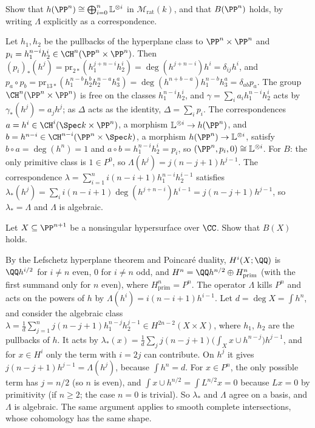 \begin{exercise}\label{absolute-hodge:exercise-projective-space}
Show that $h(\PP^n) \cong \bigoplus_{i=0}^n\mathbb{L}^{\otimes i}$ in $\mathcal{M}_{\mathrm{rat}}(k)$, and that $B(\PP^n)$ holds, by writing $\Lambda$ explicitly as a correspondence.
\end{exercise}

\begin{solution}
Let $h_1, h_2$ be the pullbacks of the hyperplane class to $\PP^n \times \PP^n$ and $p_i = h_1^{n-i}h_2^i \in \CH^n(\PP^n \times \PP^n)$. Then $(p_i)_*(h^j) = \mathrm{pr}_{2*}(h_1^{j+n-i}h_2^i) = \deg(h^{j+n-i})h^i = \delta_{ij}h^i$, and
$p_a \circ p_b = \mathrm{pr}_{13*}(h_1^{n-b}h_2^{b}h_2^{n-a}h_3^a) = \deg(h^{n+b-a})h_1^{n-b}h_3^a = \delta_{ab}p_a$. The group $\CH^n(\PP^n \times \PP^n)$ is free on the classes $h_1^{n-i}h_2^i$, and
$\gamma = \sum_ia_ih_1^{n-i}h_2^i$ acts by $\gamma_*(h^j) = a_jh^j$; as $\Delta$ acts as the identity, $\Delta = \sum_ip_i$. The correspondences $a = h^i \in \CH^i(\Spec k \times \PP^n)$, a morphism $\mathbb{L}^{\otimes i} \to h(\PP^n)$,
and $b = h^{n-i} \in \CH^{n-i}(\PP^n \times \Spec k)$, a morphism $h(\PP^n) \to \mathbb{L}^{\otimes i}$, satisfy $b \circ a = \deg(h^n) = 1$ and $a \circ b = h_1^{n-i}h_2^i = p_i$, so $(\PP^n, p_i, 0) \cong \mathbb{L}^{\otimes i}$. For $B$: the
only primitive class is $1 \in P^0$, so $\Lambda(h^j) = j(n - j + 1)h^{j-1}$. The correspondence $\lambda = \sum_{i=1}^ni(n - i + 1)h_1^{n-i}h_2^{i-1}$ satisfies
$\lambda_*(h^j) = \sum_ii(n - i + 1)\deg(h^{j+n-i})h^{i-1} = j(n - j + 1)h^{j-1}$, so $\lambda_* = \Lambda$ and $\Lambda$ is algebraic.
\end{solution}

\begin{exercise}\label{absolute-hodge:exercise-hypersurface}
Let $X \subseteq \PP^{n+1}$ be a nonsingular hypersurface over $\CC$. Show that $B(X)$ holds.
\end{exercise}

\begin{solution}
By the Lefschetz hyperplane theorem and Poincar\'e duality, $H^i(X; \QQ)$ is $\QQ h^{i/2}$ for $i \neq n$ even, $0$ for $i \neq n$ odd, and $H^n = \QQ h^{n/2} \oplus H^n_{\mathrm{prim}}$ (with the first summand only for $n$ even),
where $H^n_{\mathrm{prim}} = P^n$. The operator $\Lambda$ kills $P^n$ and acts on the powers of $h$ by $\Lambda(h^i) = i(n - i + 1)h^{i-1}$. Let $d = \deg X = \int h^n$, and consider the algebraic class
$\lambda = \frac1d\sum_{j=1}^nj(n - j + 1)h_1^{n-j}h_2^{j-1} \in H^{2n-2}(X \times X)$, where $h_1$, $h_2$ are the pullbacks of $h$. It acts by $\lambda_*(x) = \frac1d\sum_jj(n - j + 1)\big(\int_Xx \cup h^{n-j}\big)h^{j-1}$, and for
$x \in H^i$ only the term with $i = 2j$ can contribute. On $h^j$ it gives $j(n - j + 1)h^{j-1} = \Lambda(h^j)$, because $\int h^n = d$. For $x \in P^n$, the only possible term has $j = n/2$ (so $n$ is even), and
$\int x \cup h^{n/2} = \int L^{n/2}x = 0$ because $Lx = 0$ by primitivity (if $n \geq 2$; the case $n = 0$ is trivial). So $\lambda_*$ and $\Lambda$ agree on a basis, and $\Lambda$ is algebraic. The same argument applies to
smooth complete intersections, whose cohomology has the same shape.
\end{solution}

